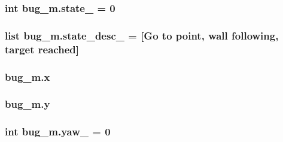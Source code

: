 \subsubsection[{\texorpdfstring{state\+\_\+}{state_}}]{\setlength{\rightskip}{0pt plus 5cm}int bug\+\_\+m.\+state\+\_\+ = 0}\hypertarget{namespacebug__m_a79dc362dff5bef439beacdd5c0c3b2f1}{}\label{namespacebug__m_a79dc362dff5bef439beacdd5c0c3b2f1}
\subsubsection[{\texorpdfstring{state\+\_\+desc\+\_\+}{state_desc_}}]{\setlength{\rightskip}{0pt plus 5cm}list bug\+\_\+m.\+state\+\_\+desc\+\_\+ = \mbox{[}\textquotesingle{}Go to point\textquotesingle{}, \textquotesingle{}wall following\textquotesingle{}, \textquotesingle{}target reached\textquotesingle{}\mbox{]}}\hypertarget{namespacebug__m_ae70f71d3816862f72790fae7bfaa543b}{}\label{namespacebug__m_ae70f71d3816862f72790fae7bfaa543b}
\subsubsection[{\texorpdfstring{x}{x}}]{\setlength{\rightskip}{0pt plus 5cm}bug\+\_\+m.\+x}\hypertarget{namespacebug__m_af10f89c7f929c9babce108f5d7382996}{}\label{namespacebug__m_af10f89c7f929c9babce108f5d7382996}
\subsubsection[{\texorpdfstring{y}{y}}]{\setlength{\rightskip}{0pt plus 5cm}bug\+\_\+m.\+y}\hypertarget{namespacebug__m_ab8596d2ae799585b0d89152b55891aa8}{}\label{namespacebug__m_ab8596d2ae799585b0d89152b55891aa8}
\subsubsection[{\texorpdfstring{yaw\+\_\+}{yaw_}}]{\setlength{\rightskip}{0pt plus 5cm}int bug\+\_\+m.\+yaw\+\_\+ = 0}\hypertarget{namespacebug__m_a8b5b5c9259592b8efd526c5adb95d95b}{}\label{namespacebug__m_a8b5b5c9259592b8efd526c5adb95d95b}
